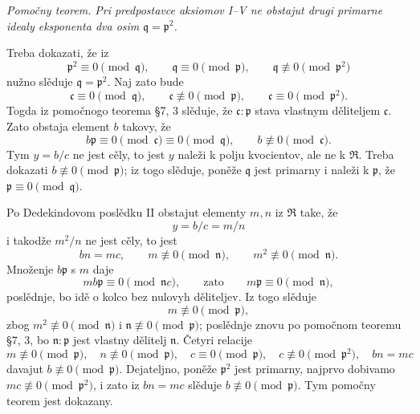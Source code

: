 \documentclass[11pt]{article}
\providecommand{\mR}{\mathfrak{R}}
\providecommand{\mc}{\mathfrak{c}}
\providecommand{\mn}{\mathfrak{n}}
\providecommand{\mq}{\mathfrak{q}}
\providecommand{\mpideal}{\mathfrak{p}}
\begin{document}
\emph{Pomočny teorem.} \emph{Pri predpostavce aksiomov I--V ne obstajut drugi primarne idealy eksponenta dva osim $\mq=\mpideal^2$.}

Treba dokazati, že iz
\[
        \mpideal^2\equiv0\pmod{\mq},
        \qquad \mq\equiv0\pmod{\mpideal},
        \qquad \mq\not\equiv0\pmod{\mpideal^2}
\]
nužno slěduje $\mq=\mpideal^2$. Naj zato bude
\[
        \mc\equiv0\pmod{\mq},
        \qquad \mc\not\equiv0\pmod{\mpideal},
        \qquad \mc\equiv0\pmod{\mpideal^2}.
\]
Togda iz pomočnogo teorema §7, 3 slěduje, že $\mc:\mpideal$ stava vlastnym děliteljem $\mc$. Zato obstaja element $b$ takovy, že
\[
        b\mpideal\equiv0\pmod{\mc}\equiv0\pmod{\mq},
        \qquad b\not\equiv0\pmod{\mc}.
\]
Tym $y=b/c$ ne jest cěly, to jest $y$ naleži k polju kvocientov, ale ne k $\mR$. Treba dokazati $b\not\equiv0\pmod{\mpideal}$; iz togo slěduje, poněže $\mq$ jest primarny i naleži k $\mpideal$, že $\mpideal\equiv0\pmod{\mq}$.

Po Dedekindovom poslědku II obstajut elementy $m,n$ iz $\mR$ take, že
\[
        y=b/c=m/n
\]
i takodže $m^2/n$ ne jest cěly, to jest
\[
        bn=mc,
        \qquad m\not\equiv0\pmod{\mn},
        \qquad m^2\not\equiv0\pmod{\mn}.
\]
Množenje $b\mpideal$ s $m$ daje
\[
        mb\mpideal\equiv0\pmod{\mn c},
        \qquad\text{zato}\qquad m\mpideal\equiv0\pmod{\mn},
\]
poslědnje, bo idě o kolco bez nulovyh děliteljev. Iz togo slěduje
\[
        m\not\equiv0\pmod{\mpideal},
\]
zbog $m^2\not\equiv0\pmod{\mn}$ i $\mn\not\equiv0\pmod{\mpideal}$; poslědnje znovu po pomočnom teoremu §7, 3, bo $\mn:\mpideal$ jest vlastny dělitelj $\mn$. Četyri relacije
\[
        m\not\equiv0\pmod{\mpideal},
        \quad n\not\equiv0\pmod{\mpideal},
        \quad c\equiv0\pmod{\mpideal},
        \quad c\not\equiv0\pmod{\mpideal^2},
        \quad bn=mc
\]
davajut $b\not\equiv0\pmod{\mpideal}$. Dejateljno, poněže $\mpideal^2$ jest primarny, najprvo dobivamo $mc\not\equiv0\pmod{\mpideal^2}$, i zato iz $bn=mc$ slěduje $b\not\equiv0\pmod{\mpideal}$. Tym pomočny teorem jest dokazany.
\end{document}
